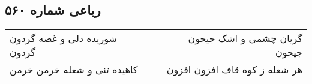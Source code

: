 \begin{center}
\section*{رباعی شماره ۵۶۰}
\label{sec:sh560}
\begin{longtable}{l p{0.5cm} r}
شوریده دلی و غصه گردون گردون
&&
گریان چشمی و اشک جیحون جیحون
\\
کاهیده تنی و شعله خرمن خرمن
&&
هر شعله ز کوه قاف افزون افزون
\\
\end{longtable}
\end{center}
